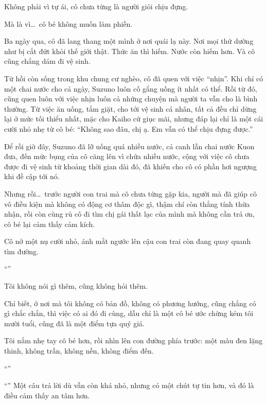 \documentclass[../main.tex]{subfiles}
\begin{document}
Không phải vì tự ái, cô chưa từng là người giỏi chịu đựng.

Mà là vì\dots\ cô bé không muốn làm phiền.

Ba ngày qua, cô đã lang thang một mình ở nơi quái lạ này. Nơi mọi thứ dường như bị cắt đứt khỏi thế giới thật. Thức ăn thì hiếm. Nước còn hiếm hơn. Và cô cũng chẳng dám đi vệ sinh.

Từ hồi còn sống trong khu chung cư nghèo, cô đã quen với việc ``nhịn''. Khi chỉ có một chai nước cho cả ngày, Suzuno luôn cố gắng uống ít nhất có thể. Rồi từ đó, cũng quen luôn với việc nhịn luôn cả những chuyện mà người ta vẫn cho là bình thường. Từ việc ăn uống, tắm giặt, cho tới vệ sinh cá nhân, tất cả đều chỉ dừng lại ở mức tối thiểu nhất, mặc cho Kaiho cứ giục mãi, nhưng đáp lại chỉ là một cái cười nhỏ nhẹ từ cô bé: ``Không sao đâu, chị ạ. Em vẫn có thể chịu đựng được.''

Để rồi giờ đây, Suzuno đã lỡ uống quá nhiều nước, cả canh lẫn chai nước Kuon đưa, đến mức bụng của cô căng lên vì chứa nhiều nước, cộng với việc cô chưa được đi vệ sinh từ khoảng thời gian dài đó, đã khiến cho cô có phần hơi ngượng khi đề cập tới nó.

Nhưng rồi\dots\ trước người con trai mà cô chưa từng gặp kia, người mà đã giúp cô vô điều kiện mà không có động cơ thâm độc gì, thậm chí còn thẳng tính thừa nhận, rồi còn cùng rủ cô đi tìm chị gái thất lạc của mình mà không cần trả ơn, cô bé lại cảm thấy cảm kích.

Cô nở một nụ cười nhỏ, ánh mắt ngước lên cậu con trai còn đang quay quanh tìm đường.

``\textit{}''


Tôi không nói gì thêm, cũng không hỏi thêm.

Chỉ biết, ở nơi mà tôi không có bản đồ, không có phương hướng, cũng chẳng có gì chắc chắn, thì việc có ai đó đi cùng, dẫu chỉ là một cô bé ước chừng kém tôi mười tuổi, cũng đã là một điểm tựa quý giá.

Tôi nắm nhẹ tay cô bé hơn, rồi nhìn lên con đường phía trước: một màu đen lặng thinh, không trần, không nền, không điểm đến.

``''

``'' Một câu trả lời dù vẫn còn khá nhỏ, nhưng có một chút tự tin hơn, và đó là điều cảm thấy an tâm hơn.
\end{document}

